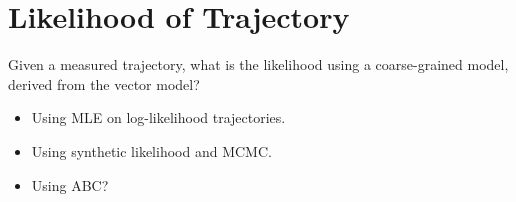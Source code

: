 \documentclass{article}
\begin{document}
\section{Likelihood of Trajectory}
Given a measured trajectory, what is the likelihood using
a coarse-grained model, derived from the vector model?

\begin{itemize}
\item Using MLE on log-likelihood trajectories.
\item Using synthetic likelihood and MCMC.
\item Using ABC?
\end{itemize}




\end{document}
